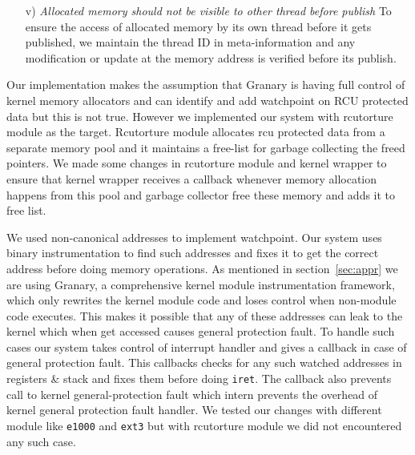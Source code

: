 \begin{enumerate}
\item[v)] \emph{Allocated memory should not be visible to other thread before publish} To ensure the access of allocated memory by its own thread before it gets published, we maintain the thread ID in meta-information and any modification or update at the memory address is verified before its publish.
\end{enumerate}

Our implementation makes the assumption that Granary is having full control of kernel memory allocators and can identify and add watchpoint on RCU protected data but this is not true.%
However we implemented our system with rcutorture module as the target. Rcutorture module allocates rcu protected data from a separate memory pool and it maintains a free-list for garbage collecting the freed pointers. We made some changes in rcutorture module and kernel wrapper to ensure that kernel wrapper receives a callback whenever memory allocation happens from this pool and garbage collector free these memory and adds it to free list. %

We used non-canonical addresses to implement watchpoint. %
Our system uses binary instrumentation to find such addresses and fixes it to get the correct address before doing memory operations. As mentioned in section~\ref{sec:appr} we are using Granary, a comprehensive kernel module instrumentation framework, which only rewrites the kernel module code and loses control when non-module code executes. This makes it possible that any of these addresses can leak to the kernel which when get accessed causes general protection fault. To handle such cases our system takes control of interrupt handler and gives a callback in case of general protection fault. This callbacks checks for any such watched addresses in registers \& stack and fixes them before doing \texttt{iret}. The callback also prevents call to kernel general-protection fault which intern  prevents the overhead of kernel general protection fault handler. We tested our changes with different module like \texttt{e1000} and \texttt{ext3} but with rcutorture module we did not encountered any such case.%
